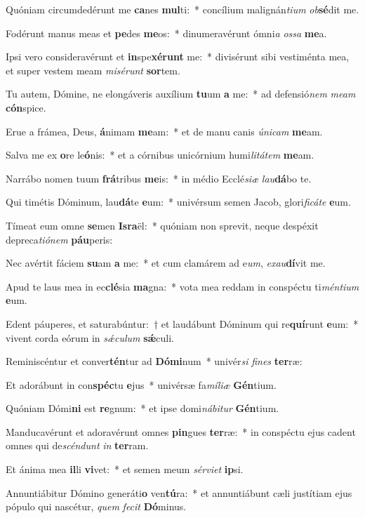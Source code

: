 \item Quóniam circumdedérunt me \textbf{ca}nes \textbf{mul}ti:~* concílium malignán\textit{ti}\textit{um} \textit{ob}\textbf{sé}dit me.
\item Fodérunt manus meas et \textbf{pe}des \textbf{me}os:~* dinumeravérunt ómni\textit{a} \textit{os}\textit{sa} \textbf{me}a.
\item Ipsi vero consideravérunt et \textbf{in}spe\textbf{xé}\textbf{runt} me:~* divisérunt sibi vestiménta mea, et super vestem meam \textit{mi}\textit{sé}\textit{runt} \textbf{sor}tem.
\item Tu autem, Dómine, ne elongáveris auxílium \textbf{tu}um \textbf{a} me:~* ad defensió\textit{nem} \textit{me}\textit{am} \textbf{cón}spice.
\item Erue a frámea, Deus, \textbf{á}nimam \textbf{me}am:~* et de manu canis \textit{ú}\textit{ni}\textit{cam} \textbf{me}am.
\item Salva me ex \textbf{o}re le\textbf{ó}nis:~* et a córnibus unicórnium humi\textit{li}\textit{tá}\textit{tem} \textbf{me}am.
\item Narrábo nomen tuum \textbf{frá}tribus \textbf{me}is:~* in médio Ecclé\textit{si}\textit{æ} \textit{lau}\textbf{dá}bo te.
\item Qui timétis Dóminum, lau\textbf{dá}te \textbf{e}um:~* univérsum semen Jacob, glori\textit{fi}\textit{cá}\textit{te} \textbf{e}um.
\item Tímeat eum omne \textbf{se}men \textbf{Is}\textbf{ra}ël:~* quóniam non sprevit, neque despéxit depreca\textit{ti}\textit{ó}\textit{nem} \textbf{páu}peris:
\item Nec avértit fáciem \textbf{su}am \textbf{a} me:~* et cum clamárem ad e\textit{um}, \textit{ex}\textit{au}\textbf{dí}vit me.
\item Apud te laus mea in ec\textbf{clé}sia \textbf{ma}gna:~* vota mea reddam in conspéctu ti\textit{mén}\textit{ti}\textit{um} \textbf{e}um.
\item Edent páuperes, et saturabúntur:~† et laudábunt Dóminum qui re\textbf{quí}runt \textbf{e}um:~* vivent corda eórum in \textit{sǽ}\textit{cu}\textit{lum} \textbf{sǽ}culi.
\item Reminiscéntur et conver\textbf{tén}tur ad \textbf{Dó}\textbf{mi}num~* univér\textit{si} \textit{fi}\textit{nes} \textbf{ter}ræ:
\item Et adorábunt in con\textbf{spéc}tu \textbf{e}jus~* univérsæ fa\textit{mí}\textit{li}\textit{æ} \textbf{Gén}tium.
\item Quóniam Dómi\textbf{ni} est \textbf{re}gnum:~* et ipse domi\textit{ná}\textit{bi}\textit{tur} \textbf{Gén}tium.
\item Manducavérunt et adoravérunt omnes \textbf{pin}gues \textbf{ter}ræ:~* in conspéctu ejus cadent omnes qui de\textit{scén}\textit{dunt} \textit{in} \textbf{ter}ram.
\item Et ánima mea \textbf{il}li \textbf{vi}vet:~* et semen meum \textit{sér}\textit{vi}\textit{et} \textbf{ip}si.
\item Annuntiábitur Dómino generáti\textbf{o} ven\textbf{tú}ra:~* et annuntiábunt cæli justítiam ejus pópulo qui nascétur, \textit{quem} \textit{fe}\textit{cit} \textbf{Dó}minus.
